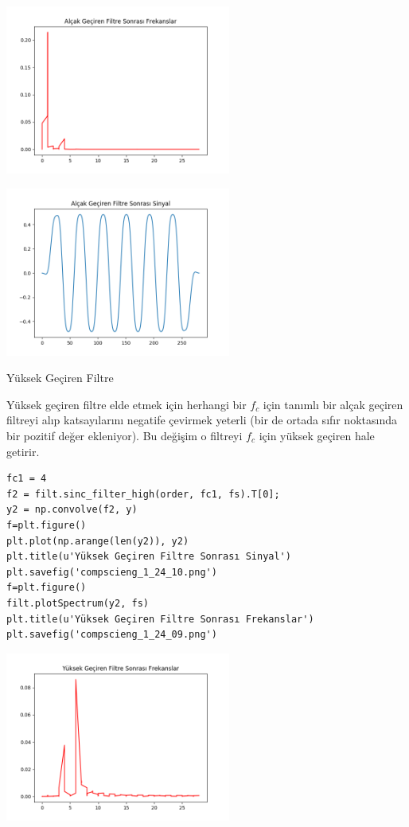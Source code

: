 \documentclass[12pt,fleqn]{article}\usepackage{../../common}
\begin{document}
\includegraphics[width=20em]{compscieng_1_24_07.png}

\includegraphics[width=20em]{compscieng_1_24_08.png}

Yüksek Geçiren Filtre

Yüksek geçiren filtre elde etmek için herhangi bir $f_c$ için tanımlı bir
alçak geçiren filtreyi alıp katsayılarını negatife çevirmek yeterli (bir de
ortada sıfır noktasında bir pozitif değer ekleniyor). Bu değişim o filtreyi
$f_c$ için yüksek geçiren hale getirir.

\begin{verbatim}
fc1 = 4
f2 = filt.sinc_filter_high(order, fc1, fs).T[0];
y2 = np.convolve(f2, y)
f=plt.figure()
plt.plot(np.arange(len(y2)), y2)
plt.title(u'Yüksek Geçiren Filtre Sonrası Sinyal')
plt.savefig('compscieng_1_24_10.png')
f=plt.figure()
filt.plotSpectrum(y2, fs)
plt.title(u'Yüksek Geçiren Filtre Sonrası Frekanslar')
plt.savefig('compscieng_1_24_09.png')
\end{verbatim}

\includegraphics[width=20em]{compscieng_1_24_09.png}
\end{document}
